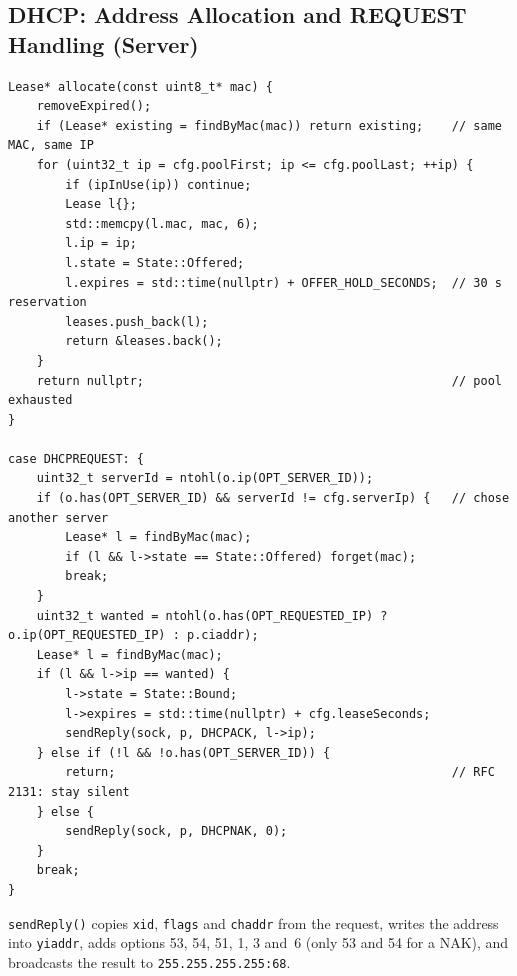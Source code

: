 \documentclass[11pt]{article}
\begin{document}
\subsection{DHCP: Address Allocation and REQUEST Handling (Server)}
\begin{lstlisting}
Lease* allocate(const uint8_t* mac) {
    removeExpired();
    if (Lease* existing = findByMac(mac)) return existing;    // same MAC, same IP
    for (uint32_t ip = cfg.poolFirst; ip <= cfg.poolLast; ++ip) {
        if (ipInUse(ip)) continue;
        Lease l{};
        std::memcpy(l.mac, mac, 6);
        l.ip = ip;
        l.state = State::Offered;
        l.expires = std::time(nullptr) + OFFER_HOLD_SECONDS;  // 30 s reservation
        leases.push_back(l);
        return &leases.back();
    }
    return nullptr;                                           // pool exhausted
}

case DHCPREQUEST: {
    uint32_t serverId = ntohl(o.ip(OPT_SERVER_ID));
    if (o.has(OPT_SERVER_ID) && serverId != cfg.serverIp) {   // chose another server
        Lease* l = findByMac(mac);
        if (l && l->state == State::Offered) forget(mac);
        break;
    }
    uint32_t wanted = ntohl(o.has(OPT_REQUESTED_IP) ? o.ip(OPT_REQUESTED_IP) : p.ciaddr);
    Lease* l = findByMac(mac);
    if (l && l->ip == wanted) {
        l->state = State::Bound;
        l->expires = std::time(nullptr) + cfg.leaseSeconds;
        sendReply(sock, p, DHCPACK, l->ip);
    } else if (!l && !o.has(OPT_SERVER_ID)) {
        return;                                               // RFC 2131: stay silent
    } else {
        sendReply(sock, p, DHCPNAK, 0);
    }
    break;
}
\end{lstlisting}
\texttt{sendReply()} copies \texttt{xid}, \texttt{flags} and \texttt{chaddr} from the
request, writes the address into \texttt{yiaddr}, adds options 53, 54, 51, 1, 3 and~6
(only 53 and 54 for a NAK), and broadcasts the result to \texttt{255.255.255.255:68}.
\end{document}

